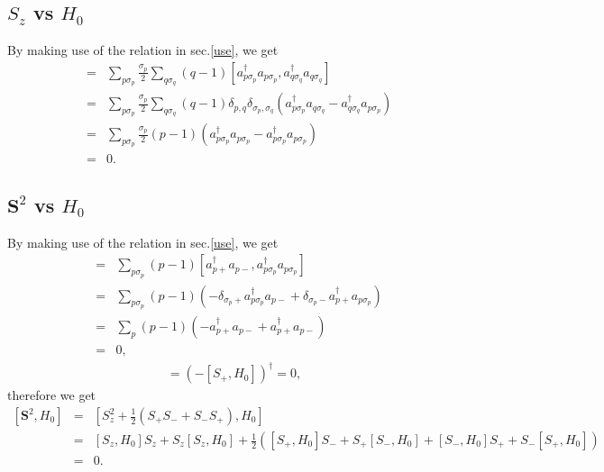 \documentclass{article}
\begin{document}
\subsection{$S_z$ vs $H_0$}
By making use of the relation in sec.\ref{use}, we get
\begin{eqnarray*}
[S_z,H_0] &=& \sum_{p \sigma_p}\frac{\sigma_p}{2} \sum_{q\sigma_q} (q-1) [a_{p \sigma_p}^{\dagger} a_{p \sigma_p},a_{q \sigma_q}^{\dagger} a_{q \sigma_q}] \\
&=& \sum_{p \sigma_p}\frac{\sigma_p}{2} \sum_{q\sigma_q} (q-1) \delta_{p,q}\delta_{\sigma_p,\sigma_q} \left(  a_{p \sigma_p}^{\dagger} a_{q \sigma_q} - a_{q \sigma_q}^{\dagger}a_{p \sigma_p}  \right) \\
&=& \sum_{p \sigma_p}\frac{\sigma_p}{2} (p-1) \left(  a_{p \sigma_p}^{\dagger} a_{p \sigma_p} - a_{p \sigma_p}^{\dagger}a_{p \sigma_p}  \right) \\
&=& 0.
\end{eqnarray*}

\subsection{$\bm{S}^2$ vs $H_0$}
By making use of the relation in sec.\ref{use}, we get
\begin{eqnarray*}
[S_+,H_0] &=& \sum_{p \sigma_p} (p-1) [ a_{p+}^{\dagger} a_{p-} , a_{p \sigma_p}^{\dagger} a_{p \sigma_p} ] \\
&=& \sum_{p \sigma_p} (p-1) \left( - \delta_{\sigma_p +} a_{p\sigma_p}^{\dagger} a_{p-} + \delta_{\sigma_p -} a_{p +}^{\dagger} a_{p \sigma_p} \right) \\
&=& \sum_{p} (p-1) \left( -  a_{p +}^{\dagger} a_{p-} +  a_{p +}^{\dagger} a_{p -} \right) \\
&=& 0,
\end{eqnarray*}
\begin{eqnarray*}
[S_-,H_0] = \left( - [S_+,H_0] \right)^{\dagger} = 0,
\end{eqnarray*}
therefore we get
\begin{eqnarray*}
\left[ \bm{S}^2,H_0 \right] &=& [ S_z^2 + \frac{1}{2}(S_{+}S_{-} + S_{-}S_{+}) , H_0 ] \\
&=& [S_z,H_0]S_z + S_z[S_z,H_0] + \frac{1}{2} \left( [S_{+},H_0] S_{-} + S_{+} [S_{-},H_0] + [S_{-},H_0] S_{+} + S_{-} [S_{+},H_0] \right) \\
&=& 0.
\end{eqnarray*}
\end{document}
